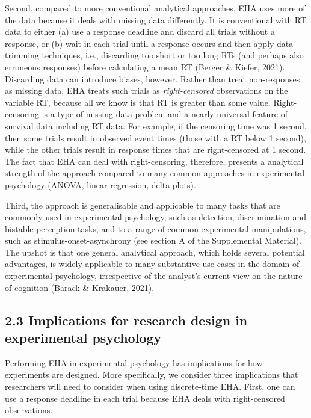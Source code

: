 \documentclass[
  man, donotrepeattitle,floatsintext]{apa6}
\begin{document}
Second, compared to more conventional analytical approaches, EHA uses more of the data because it deals with missing data differently.
It is conventional with RT data to either (a) use a response deadline and discard all trials without a response, or (b) wait in each trial until a response occurs and then apply data trimming techniques, i.e., discarding too short or too long RTs (and perhaps also erroneous responses) before calculating a mean RT (Berger \& Kiefer, 2021).
Discarding data can introduce biases, however.
Rather than treat non-responses as missing data, EHA treats such trials as \emph{right-censored} observations on the variable RT, because all we know is that RT is greater than some value.
Right-censoring is a type of missing data problem and a nearly universal feature of survival data including RT data.
For example, if the censoring time was 1 second, then some trials result in observed event times (those with a RT below 1 second), while the other trials result in response times that are right-censored at 1 second.
The fact that EHA can deal with right-censoring, therefore, presents a analytical strength of the approach compared to many common approaches in experimental psychology (ANOVA, linear regression, delta plots).

Third, the approach is generalisable and applicable to many tasks that are commonly used in experimental psychology, such as detection, discrimination and bistable perception tasks, and to a range of common experimental manipulations, such as stimulus-onset-asynchrony (see section A of the Supplemental Material).
The upshot is that one general analytical approach, which holds several potential advantages, is widely applicable to many substantive use-cases in the domain of experimental psychology, irrespective of the analyst's current view on the nature of cognition (Barack \& Krakauer, 2021).

\subsection{2.3 Implications for research design in experimental psychology}\label{implications-for-research-design-in-experimental-psychology}

Performing EHA in experimental psychology has implications for how experiments are designed.
More specifically, we consider three implications that researchers will need to consider when using discrete-time EHA. First, one can use a response deadline in each trial because EHA deals with right-censored observations.
\end{document}
